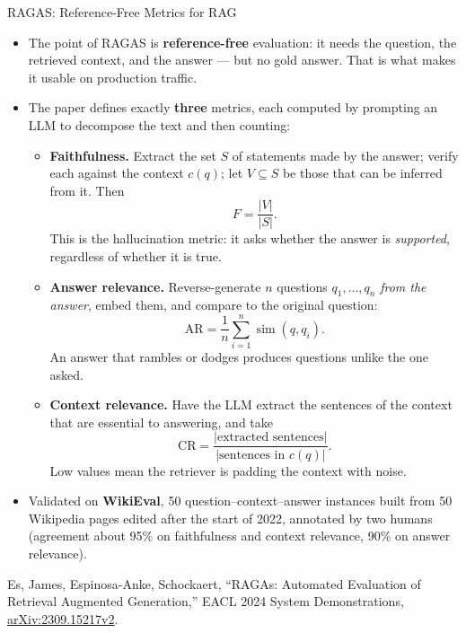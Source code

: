 \begin{frame}[allowframebreaks]{RAGAS: Reference-Free Metrics for RAG}
  \begin{itemize}\footnotesize\itemsep0.3em
    \item[\textcolor{red}{$\blacktriangleright$}] The point of RAGAS is \textbf{reference-free} evaluation: it needs the question, the retrieved context, and the answer --- but no gold answer. That is what makes it usable on production traffic.
    \item[\textcolor{red}{$\blacktriangleright$}] The paper defines exactly \textbf{three} metrics, each computed by prompting an LLM to decompose the text and then counting:
      \begin{itemize}\itemsep0.25em
        \item \textbf{Faithfulness.} Extract the set $S$ of statements made by the answer; verify each against the context $c(q)$; let $V \subseteq S$ be those that can be inferred from it. Then
          \[ F = \frac{|V|}{|S|}. \]
          This is the hallucination metric: it asks whether the answer is \textit{supported}, regardless of whether it is true.
        \item \textbf{Answer relevance.} Reverse-generate $n$ questions $q_1,\dots,q_n$ \textit{from the answer}, embed them, and compare to the original question:
          \[ \text{AR} = \frac{1}{n}\sum_{i=1}^{n} \operatorname{sim}(q, q_i). \]
          An answer that rambles or dodges produces questions unlike the one asked.
        \item \textbf{Context relevance.} Have the LLM extract the sentences of the context that are essential to answering, and take
          \[ \text{CR} = \frac{|\text{extracted sentences}|}{|\text{sentences in } c(q)|}. \]
          Low values mean the retriever is padding the context with noise.
      \end{itemize}
    \item[\textcolor{red}{$\blacktriangleright$}] Validated on \textbf{WikiEval}, 50 question--context--answer instances built from 50 Wikipedia pages edited after the start of 2022, annotated by two humans (agreement about 95\% on faithfulness and context relevance, 90\% on answer relevance).
  \end{itemize}
  \vspace{0.1em}
  {\scriptsize Es, James, Espinosa-Anke, Schockaert, ``RAGAs: Automated Evaluation of Retrieval Augmented Generation,'' EACL 2024 System Demonstrations, \href{https://arxiv.org/abs/2309.15217v2}{arXiv:2309.15217v2}.}
\end{frame}


